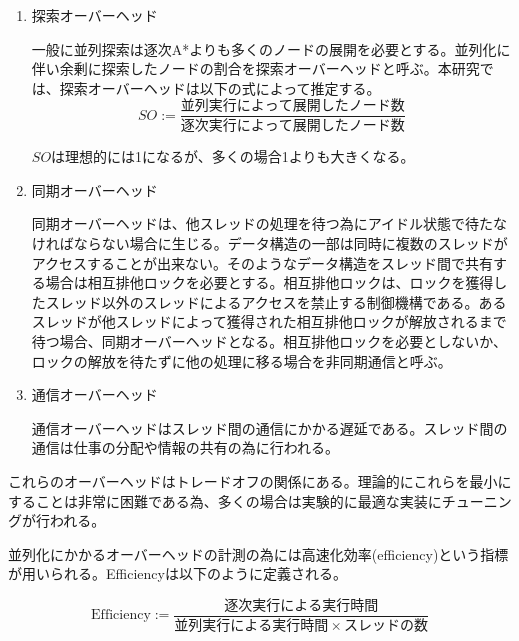 \documentclass{jsarticle}
\renewcommand{\textbf}{} %
\begin{document}
\begin{enumerate}
\item 探索オーバーヘッド
\newline

一般に並列探索は逐次A*よりも多くのノードの展開を必要とする。並列化に伴い余剰に探索したノードの割合を探索オーバーヘッドと呼ぶ。本研究では、探索オーバーヘッドは以下の式によって推定する。
\newline
\begin{equation}
	SO := \frac{並列実行によって展開したノード数}{逐次実行によって展開したノード数}
\end{equation}


$SO$は理想的には1になるが、多くの場合1よりも大きくなる。
\newline

\item 同期オーバーヘッド
\newline

同期オーバーヘッドは、他スレッドの処理を待つ為にアイドル状態で待たなければならない場合に生じる。データ構造の一部は同時に複数のスレッドがアクセスすることが出来ない。そのようなデータ構造をスレッド間で共有する場合は相互排他ロックを必要とする。相互排他ロックは、ロックを獲得したスレッド以外のスレッドによるアクセスを禁止する制御機構である。あるスレッドが他スレッドによって獲得された相互排他ロックが解放されるまで待つ場合、同期オーバーヘッドとなる。相互排他ロックを必要としないか、ロックの解放を待たずに他の処理に移る場合を非同期通信と呼ぶ。
\newline

\item 通信オーバーヘッド
\newline

通信オーバーヘッドはスレッド間の通信にかかる遅延である。スレッド間の通信は仕事の分配や情報の共有の為に行われる。

\end{enumerate}

これらのオーバーヘッドはトレードオフの関係にある。理論的にこれらを最小にすることは非常に困難である為、多くの場合は実験的に最適な実装にチューニングが行われる。

並列化にかかるオーバーヘッドの計測の為には\textbf{高速化効率(efficiency)}という指標が用いられる。Efficiencyは以下のように定義される。
\newline

\begin{equation}
	\mbox{Efficiency} := \frac{逐次実行による実行時間}{並列実行による実行時間 \times スレッドの数} %
\end{equation}
\end{document}
